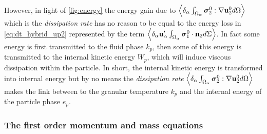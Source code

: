 However, in light of \ref{fig:energy} the energy gain due to  $\left<\delta_\alpha \int_{\Omega_\alpha} \bm{\sigma}_2^0:\mathbf{\nabla} \textbf{u}_2^0 d\Omega\right>$ which is the \textit{dissipation rate} has no reason to be equal to the energy loss in \ref{eq:dt_hybrid_up2} represented by the term $\left<\delta_\alpha \textbf{u}_\alpha' \int_{\Omega_\alpha} \bm{\sigma}_1^0 \cdot \textbf{n}_2 d\Sigma\right>$. 
In fact some energy is first transmitted to the fluid phase $k_p$, then some of this energy is transmitted to the internal kinetic energy $W_p$, which will induce viscous dissipation within the particle. 
In short, the internal kinetic energy is transformed into internal energy but by no means the \textit{dissipation rate} $\left<\delta_\alpha \int_{\Omega_\alpha} \bm{\sigma}_2^0:\mathbf{\nabla} \textbf{u}_2^0 d\Omega\right>$ makes the link between to the granular temperature $k_p$ and the internal energy of the particle phase $e_p$. 

\subsubsection*{The first order momentum and mass equations}

